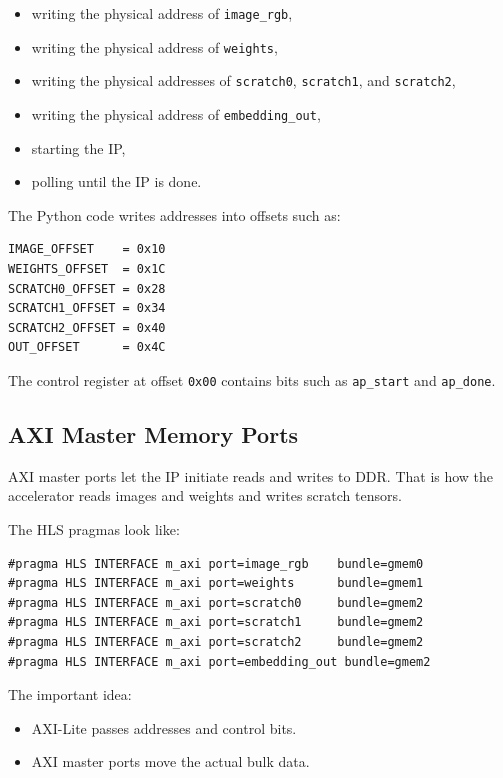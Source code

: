 \documentclass[11pt]{article}
\newcommand{\code}[1]{\texttt{#1}}
\begin{document}
\begin{itemize}[leftmargin=1.4em]
  \item writing the physical address of \code{image\_rgb},
  \item writing the physical address of \code{weights},
  \item writing the physical addresses of \code{scratch0}, \code{scratch1}, and \code{scratch2},
  \item writing the physical address of \code{embedding\_out},
  \item starting the IP,
  \item polling until the IP is done.
\end{itemize}

The Python code writes addresses into offsets such as:

\begin{lstlisting}
IMAGE_OFFSET    = 0x10
WEIGHTS_OFFSET  = 0x1C
SCRATCH0_OFFSET = 0x28
SCRATCH1_OFFSET = 0x34
SCRATCH2_OFFSET = 0x40
OUT_OFFSET      = 0x4C
\end{lstlisting}

The control register at offset \code{0x00} contains bits such as \code{ap\_start} and \code{ap\_done}.

\subsection{AXI Master Memory Ports}

AXI master ports let the IP initiate reads and writes to DDR.
That is how the accelerator reads images and weights and writes scratch tensors.

The HLS pragmas look like:

\begin{lstlisting}
#pragma HLS INTERFACE m_axi port=image_rgb    bundle=gmem0
#pragma HLS INTERFACE m_axi port=weights      bundle=gmem1
#pragma HLS INTERFACE m_axi port=scratch0     bundle=gmem2
#pragma HLS INTERFACE m_axi port=scratch1     bundle=gmem2
#pragma HLS INTERFACE m_axi port=scratch2     bundle=gmem2
#pragma HLS INTERFACE m_axi port=embedding_out bundle=gmem2
\end{lstlisting}

The important idea:

\begin{itemize}[leftmargin=1.4em]
  \item AXI-Lite passes addresses and control bits.
  \item AXI master ports move the actual bulk data.
\end{itemize}
\end{document}
